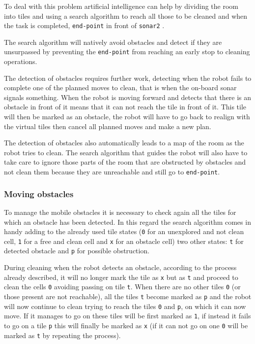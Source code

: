To deal with this problem artificial intelligence can help by dividing the room into tiles and using a search algorithm to reach all those to be cleaned and when the task is completed, \texttt{end-point} in front of \texttt{sonar2} .

The search algorithm will natively avoid obstacles and detect if they are unsurpassed by preventing the \texttt{end-point} from reaching an early stop to cleaning operations.

The detection of obstacles requires further work, detecting when the robot fails to complete one of the planned moves to clean, that is when the on-board sonar signals something. When the robot is moving forward and detects that there is an obstacle in front of it means that it can not reach the tile in front of it. This tile will then be marked as an obstacle, the robot will have to go back to realign with the virtual tiles then cancel all planned moves and make a new plan.

The detection of obstacles also automatically leads to a map of the room as the robot tries to clean. The search algorithm that guides the robot will also have to take care to ignore those parts of the room that are obstructed by obstacles and not clean them because they are unreachable and still go to \texttt{end-point}.

\subsubsection{Moving obstacles}
To manage the mobile obstacles it is necessary to check again all the tiles for which an obstacle has been detected. In this regard the search algorithm comes in handy adding to the already used tile states (\texttt{0} for an unexplored and not clean cell, \texttt{1} for a free and clean cell and \texttt{x} for an obstacle cell) two other states: \texttt{t} for detected obstacle and \texttt{p} for possible obstruction.

During cleaning when the robot detects an obstacle, according to the process already described, it will no longer mark the tile as \texttt{x} but as \texttt{t} and proceed to clean the cells \texttt{0} avoiding passing on tile \texttt{t}. When there are no other tiles \texttt{0} (or those present are not reachable), all the tiles \texttt{t} become marked as \texttt{p} and the robot will now continue to clean trying to reach the tiles \texttt{0} and \texttt{p}, on which it can now move. If it manages to go on these tiles will be first marked as \texttt{1}, if instead it fails to go on a tile \texttt{p} this will finally be marked as \texttt{x} (if it can not go on one \texttt{0} will be marked as \texttt{t} by repeating the process).

